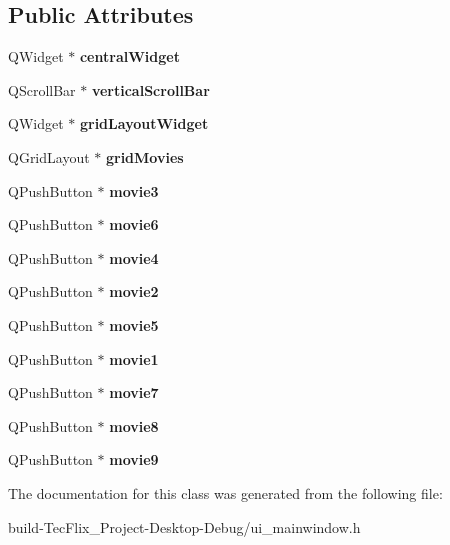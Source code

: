 \subsection*{Public Attributes}
\begin{DoxyCompactItemize}
\item 
\mbox{\label{classUi__MainWindow_a30075506c2116c3ed4ff25e07ae75f81}} 
Q\+Widget $\ast$ {\bfseries central\+Widget}
\item 
\mbox{\label{classUi__MainWindow_ad011ead19a7a485ea524e135f7286d58}} 
Q\+Scroll\+Bar $\ast$ {\bfseries vertical\+Scroll\+Bar}
\item 
\mbox{\label{classUi__MainWindow_a08a857edea57a9e53915f22187c06813}} 
Q\+Widget $\ast$ {\bfseries grid\+Layout\+Widget}
\item 
\mbox{\label{classUi__MainWindow_ab4436a4df4d77148f09bb5e1f6ce57fa}} 
Q\+Grid\+Layout $\ast$ {\bfseries grid\+Movies}
\item 
\mbox{\label{classUi__MainWindow_ab963fb159a05e185cd4425c002824fa6}} 
Q\+Push\+Button $\ast$ {\bfseries movie3}
\item 
\mbox{\label{classUi__MainWindow_a9210fb0f8849796acf1ad0ae6320f5b5}} 
Q\+Push\+Button $\ast$ {\bfseries movie6}
\item 
\mbox{\label{classUi__MainWindow_ab1ddc1dd0fc134d78152ed021f4087d2}} 
Q\+Push\+Button $\ast$ {\bfseries movie4}
\item 
\mbox{\label{classUi__MainWindow_a8c2122c4887f4911c02fbb82dfb5f0ad}} 
Q\+Push\+Button $\ast$ {\bfseries movie2}
\item 
\mbox{\label{classUi__MainWindow_a80c27b5917379909d71a9ea7601b981d}} 
Q\+Push\+Button $\ast$ {\bfseries movie5}
\item 
\mbox{\label{classUi__MainWindow_acbce0c1b3b28b72df62a783945a3dcb6}} 
Q\+Push\+Button $\ast$ {\bfseries movie1}
\item 
\mbox{\label{classUi__MainWindow_aa5fdf3446912a7f05f2791f632368af7}} 
Q\+Push\+Button $\ast$ {\bfseries movie7}
\item 
\mbox{\label{classUi__MainWindow_a0f62c079f66f22d78e7e61dbd13c909a}} 
Q\+Push\+Button $\ast$ {\bfseries movie8}
\item 
\mbox{\label{classUi__MainWindow_abdabf5f3b20190a461f6631b0ff4e542}} 
Q\+Push\+Button $\ast$ {\bfseries movie9}
\end{DoxyCompactItemize}


The documentation for this class was generated from the following file\+:\begin{DoxyCompactItemize}
\item 
build-\/\+Tec\+Flix\+\_\+\+Project-\/\+Desktop-\/\+Debug/ui\+\_\+mainwindow.\+h\end{DoxyCompactItemize}

